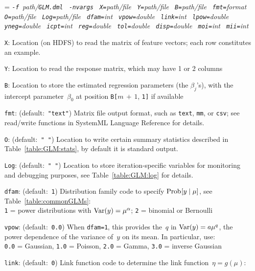 \smallskip
{}
\smallskip

{\hangindent=\parindent\noindent\it%
{\tt{}-f }path/\/{\tt{}GLM.dml}
{\tt{} -nvargs}
{\tt{} X=}path/file
{\tt{} Y=}path/file
{\tt{} B=}path/file
{\tt{} fmt=}format
{\tt{} O=}path/file
{\tt{} Log=}path/file
{\tt{} dfam=}int
{\tt{} vpow=}double
{\tt{} link=}int
{\tt{} lpow=}double
{\tt{} yneg=}double
{\tt{} icpt=}int
{\tt{} reg=}double
{\tt{} tol=}double
{\tt{} disp=}double
{\tt{} moi=}int
{\tt{} mii=}int

}

\smallskip
{}
\begin{Description}
\item[{\tt X}:]
Location (on HDFS) to read the matrix of feature vectors; each row constitutes
an example.
\item[{\tt Y}:]
Location to read the response matrix, which may have 1 or 2 columns
\item[{\tt B}:]
Location to store the estimated regression parameters (the $\beta_j$'s), with the
intercept parameter~$\beta_0$ at position {\tt B[}$m\,{+}\,1$, {\tt 1]} if available
\item[{\tt fmt}:] (default:\mbox{ }{\tt "text"})
Matrix file output format, such as {\tt text}, {\tt mm}, or {\tt csv};
see read/write functions in SystemML Language Reference for details.
\item[{\tt O}:] (default:\mbox{ }{\tt " "})
Location to write certain summary statistics described in Table~\ref{table:GLM:stats},
by default it is standard output.
\item[{\tt Log}:] (default:\mbox{ }{\tt " "})
Location to store iteration-specific variables for monitoring and debugging purposes,
see Table~\ref{table:GLM:log} for details.
\item[{\tt dfam}:] (default:\mbox{ }{\tt 1})
Distribution family code to specify $\mathop{\mathrm{Prob}\hspace{0.5pt}}\nolimits[y\mid \mu]$, see Table~\ref{table:commonGLMs}:\\
{\tt 1} = power distributions with $\mathop{\mathrm{Var}}\nolimits(y) = \mu^{\alpha}$;
{\tt 2} = binomial or Bernoulli
\item[{\tt vpow}:] (default:\mbox{ }{\tt 0.0})
When {\tt dfam=1}, this provides the~$q$ in $\mathop{\mathrm{Var}}\nolimits(y) = a\mu^q$, the power
dependence of the variance of~$y$ on its mean.  In particular, use:\\
{\tt 0.0} = Gaussian,
{\tt 1.0} = Poisson,
{\tt 2.0} = Gamma,
{\tt 3.0} = inverse Gaussian
\item[{\tt link}:] (default:\mbox{ }{\tt 0})
Link function code to determine the link function~$\eta = g(\mu)$:\\

\end{Description}
